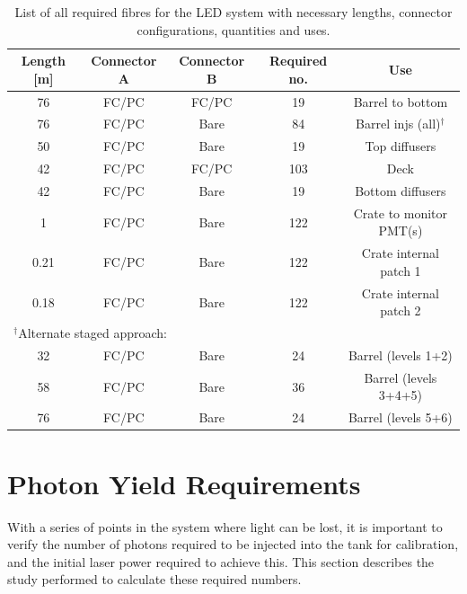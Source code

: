 \documentclass[a4paper,11pt]{article}
\begin{document}
\begin{table}[h]
\centering
\setlength{\tabcolsep}{4pt}
\begin{tabular}{ccccc}
\toprule
Length [m]	&	Connector A	&	Connector B	&	Required no.	&	Use		\\ \midrule
76			&	FC/PC		&	FC/PC		&	19				&	Barrel to bottom	\\
76			&	FC/PC		&	Bare		&	84				&	Barrel injs (all)$^\dagger$	\\
50			&	FC/PC		&	Bare		&	19				&	Top diffusers \\
42			&	FC/PC		&	FC/PC		&	103				&	Deck		\\
42			&	FC/PC		&	Bare		&	19				&	Bottom diffusers	\\
1			&	FC/PC		&	Bare		&	122				&	Crate to monitor PMT(s)	\\
0.21		&	FC/PC		&	Bare		&	122				&	Crate internal patch 1	\\
0.18		&	FC/PC		&	Bare		&	122				&	Crate internal patch 2 \\ \midrule
\multicolumn{3}{l}{$^\dagger$Alternate staged approach:}			&					&			\\
32			&	FC/PC		&	Bare		&	24				&	Barrel (levels 1+2) \\
58			&	FC/PC		&	Bare		&	36				&	Barrel (levels 3+4+5)	\\
76			&	FC/PC		&	Bare		&	24				&	Barrel (levels 5+6)	\\
\bottomrule
\end{tabular}
\caption{List of all required fibres for the LED system with necessary lengths, connector configurations, quantities and uses.}\label{tab:fibreSummaryLED}
\end{table}



\clearpage

\section{Photon Yield Requirements}\label{sec:photonreq}

With a series of points in the system where light can be lost, it is important to verify the number of photons required to be injected into the tank for calibration, and the initial laser power required to achieve this. This section describes the study performed to calculate these required numbers.
\end{document}
